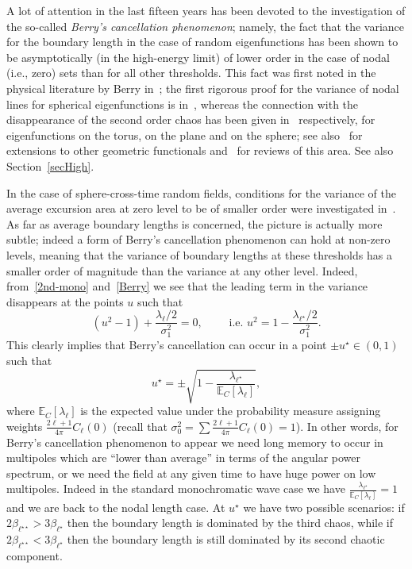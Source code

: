 \documentclass[AHL,Unicode,longabstracts,published]{cedram}
\newcommand{\bbE}{\mathbb{E}}
\begin{document}
\begin{rema}
A lot of attention in the last fifteen years has been devoted to the investigation of the so-called \emph{Berry's cancellation phenomenon}; namely, the fact that the variance for the boundary length in the case of random eigenfunctions has been shown to be asymptotically (in the high-energy limit) of lower order in the case of nodal (i.e., zero) sets than for all other thresholds. This fact was first noted in the physical literature by Berry in~\cite{Ber02}; the first rigorous proof for the variance of nodal lines for spherical eigenfunctions is in~\cite{Wig}, whereas the connection with the disappearance of the second order chaos has been given in~\cite{MPRW16, MRW, NPR19} respectively, for eigenfunctions on the torus, on the plane and on the sphere; see also~\cite{CM2018} for extensions to other geometric functionals and~\cite{M2022,Rossi2018, Wig22} for reviews of this area. See also Section~\ref{secHigh}.

\noindent In the case of sphere-cross-time random fields, conditions for the variance of the average excursion area at zero level to be of smaller order were investigated in~\cite{MRV:20}. As far as average boundary lengths is concerned, the picture is actually more subtle; indeed a form of Berry's cancellation phenomenon can hold at non-zero levels, meaning that the variance of boundary lengths at these thresholds has a smaller order of magnitude than the variance at any other level. Indeed, from~\eqref{2nd-mono} and~\eqref{Berry} we see that the leading term in the variance disappears at the points $u$ such that
\begin{equation*}
\left(u^{2}-1\right)+\frac{\lambda _{\ell }/2}{\sigma _{1}^{2}}=0,\qquad\text{ i.e. } u^{2}=1-\frac{\lambda _{\ell ^{\star }}/2}{\sigma _{1}^{2}}\text{.}
\end{equation*}
This clearly implies that Berry's cancellation can occur in a point $\pm u^{\star }\in (0,1)$ such that
\begin{equation*}
u^{\star }=\pm \sqrt{1-\frac{\mathbb{\lambda }_{\ell ^{\star }}}{\bbE _{C}[\mathbb{\lambda }_{\ell }]}},
\end{equation*}
where $\bbE_{C}[\mathbb{\lambda }_{\ell }]$ is the expected value under the probability measure assigning weights $\frac{2\ell +1}{4\pi } C_{\ell }(0)$ (recall that $\sigma_0^2=\sum \frac{2\ell +1}{4\pi }C_{\ell }(0)=1$). In other words, for Berry's cancellation phenomenon to appear we need long memory to occur in multipoles which are ``lower than average'' in terms of the angular power spectrum, or we need the field at any given time to have huge power on low multipoles. Indeed in the standard monochromatic wave case we have $\frac{\mathbb{\lambda }_{\ell ^{\star }}}{\bbE_{C}[\mathbb{
\lambda }_{\ell }]}=1$ and we are back to the nodal length case. At $u^\star$ we have two possible scenarios: if $2\beta_{\ell^{\star\star}}>3\beta_{
\ell^{\star}}$ then the boundary length is dominated by the third chaos, while if $2\beta_{\ell^{\star\star}}<3\beta_{\ell^{\star}}$ then the boundary length is still dominated by its second chaotic component.
\end{rema}
\end{document}
